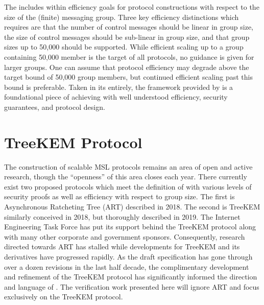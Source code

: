 The  includes within  efficiency goals \autocite{ietf-mls-architecture-07} for protocol constructions with respect to the size of the (finite) messaging group.
Three key efficiency distinctions which  requires are that the number of control messages should be linear in group size, the size of control messages should be sub-linear in group size, and that group sizes up to 50,000 should be supported.
While efficient scaling up to a group containing 50,000 member is the target of all  protocols, no guidance is given for larger groups.
One can assume that protocol efficiency may degrade above the target bound of 50,000 group members, but continued efficient scaling past this bound is preferable.
Taken in its entirely, the framework provided by  is a foundational piece of achieving  with well understood efficiency, security guarantees, and protocol design.


\hypertarget{sec:treekem-protocol}{%
\section{TreeKEM Protocol}\label{sec:treekem-protocol}}

The construction of scalable MSL protocols remains an area of open and active research, though the ``openness'' of this area closes each year.
There currently exist two proposed protocols which meet the definition of  with various levels of security proofs as well as efficiency with respect to group size.
The first is Asynchronous Ratcheting Tree (ART) \autocite{cohn2018ends} described in 2018.
The second is TreeKEM \autocite{bhargavan:hal-02425247} similarly conceived in 2018, but thoroughly described in 2019.
The Internet Engineering Task Force has put its support behind the TreeKEM protocol along with many other corporate and government sponsors.
Consequently, research directed towards ART has stalled while developments for TreeKEM and its derivatives have progressed rapidly.
As the  draft specification has gone through over a dozen revisions in the last half decade, the complimentary development and refinement of the TreeKEM protocol has significantly informed the direction and language of .
The verification work presented here will ignore ART and focus exclusively on the TreeKEM protocol.


